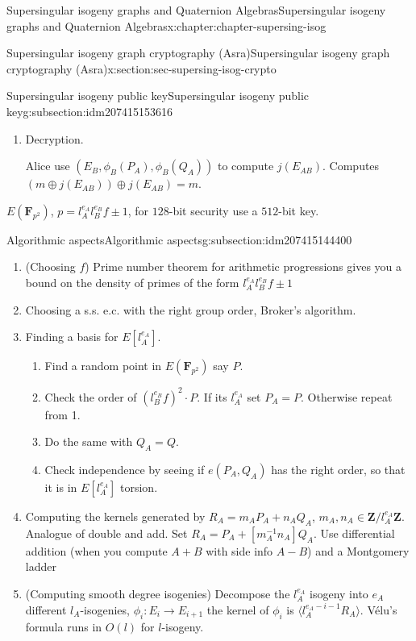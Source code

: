 \documentclass[oneside,10pt,]{book}
\numberwithin{equation}{section}
\newcommand{\inv}{^{-1}}
\newcommand{\lb}{[}
\newcommand{\rb}{]}
\newcommand{\ZZ}{\mathbf{Z}}
\newcommand{\FF}{\mathbf{F}}
\begin{document}
\begin{chapterptx}{Supersingular isogeny graphs and Quaternion Algebras}{}{Supersingular isogeny graphs and Quaternion Algebras}{}{}{x:chapter:chapter-supersing-isog}
\begin{sectionptx}{Supersingular isogeny graph cryptography (Asra)}{}{Supersingular isogeny graph cryptography (Asra)}{}{}{x:section:sec-supersing-isog-crypto}
\begin{subsectionptx}{Supersingular isogeny public key}{}{Supersingular isogeny public key}{}{}{g:subsection:idm207415153616}
\begin{enumerate}
\par
Send Alice \(c = (E_B, \phi_B(P_A), \phi_B(Q_A), m\oplus j(E_{AB}))\)%
\item{}Decryption.%
\par
Alice use \((E_B, \phi_B(P_A), \phi_B(Q_A))\) to compute \(j(E_{AB})\). Computes \((m\oplus j(E_{AB})) \oplus j(E_{AB}) = m\).%
\end{enumerate}
%
\par
\(E(\FF_{p^2})\), \(p = l_A^{e_A} l_B^{e_B} f \pm 1\), for \(128\)-bit security use a \(512\)-bit key.%
\end{subsectionptx}
%
%
\typeout{************************************************}
\typeout{************************************************}
%
\begin{subsectionptx}{Algorithmic aspects}{}{Algorithmic aspects}{}{}{g:subsection:idm207415144400}
%
\begin{enumerate}
\item{}(Choosing \(f\)) Prime number theorem for arithmetic progressions gives you a bound on the density of primes of the form \(l_A^{e_A} l_B^{e_B} f \pm 1\)%
\item{}Choosing a s.s. e.c. with the right group order, Broker's algorithm.%
\item{}Finding a basis for \(E\lb l_A^{e_A}\rb\).%
\begin{enumerate}
\item{}Find a random point in \(E(\FF_{p^2})\) say \(P\).%
\item{}Check the order of \((l_B^{e_B} f)^2 \cdot P\). If its \(l_A^{e_A}\) set \(P_A = P\). Otherwise repeat from 1.%
\item{}Do the same with \(Q_A = Q\).%
\item{}Check independence by seeing if \(e(P_A,Q_A) \) has the right order, so that it is in \(E\lb l_A^{e_A} \rb\) torsion.%
\end{enumerate}
%
\item{}Computing the kernels generated by \(R_A = m_A P_A + n_A Q_A\), \(m_A, n_A \in \ZZ/l_A^{e_A} \ZZ\). Analogue of double and add. Set \(R_A = P_A + \lb m_A\inv n_A\rb Q_A\). Use differential addition (when you compute \(A+B\) with side info \(A-B\)) and a Montgomery ladder%
\item{}(Computing smooth degree isogenies) Decompose the \(l_A^{e_A}\) isogeny into \(e_A\) different \(l_A\)-isogenies, \(\phi_i\colon E_i \to E_{i+1}\) the kernel of \(\phi_i\) is \(\langle l_A^{e_A - i - 1} R_A\rangle\). Vélu's formula runs in \(O(l)\) for \(l\)-isogeny.%

\end{enumerate}
\end{subsectionptx}
\end{sectionptx}
\end{chapterptx}
\end{document}
